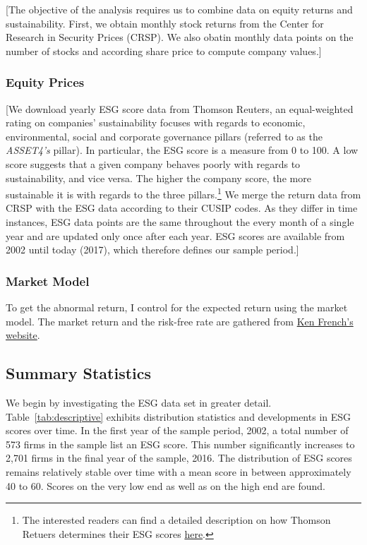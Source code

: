 \documentclass[11pt]{article}
\begin{document}
[The objective of the analysis requires us to combine data on equity returns and sustainability. First, we obtain monthly stock returns from the Center for Research in Security Prices (CRSP). We also obatin monthly data points on the number of stocks and according share price to compute company values.]

\subsubsection*{Equity Prices}
[We download yearly ESG score data from Thomson Reuters, an equal-weighted rating on companies' sustainability focuses with regards to economic, environmental, social and corporate governance pillars (referred to as the \textit{ASSET4's} pillar). In particular, the ESG score is a measure from 0 to 100. A low score suggests that a given company behaves poorly with regards to sustainability, and vice versa. The higher the company score, the more sustainable it is with regards to the three pillars.\footnote{The interested readers can find a detailed description on how Thomson Retuers determines their ESG scores \href{http://www.esade.edu/itemsweb/biblioteca/bbdd/inbbdd/archivos/Thomson_Reuters_ESG_Scores.pdf}{here}.} We merge the return data from CRSP with the ESG data according to their CUSIP codes. As they differ in time instances, ESG data points are the same throughout the every month of a single year and are updated only once after each year. ESG scores are available from 2002 until today (2017), which therefore defines our sample period.]

\subsubsection*{Market Model}
To get the abnormal return, I control for the expected return using the market model. The market return and the risk-free rate are gathered from \href{https://mba.tuck.dartmouth.edu/pages/faculty/ken.french/data_library.html}{Ken French's website}.

\subsection{Summary Statistics}

We begin by investigating the ESG data set in greater detail. Table~\ref{tab:descriptive} exhibits distribution statistics and developments in ESG scores over time. In the first year of the sample period, 2002, a total number of 573 firms in the sample list an ESG score. This number significantly increases to 2,701 firms in the final year of the sample, 2016. The distribution of ESG scores remains relatively stable over time with a mean score in between approximately 40 to 60. Scores on the very low end as well as on the high end are found.
\end{document}
